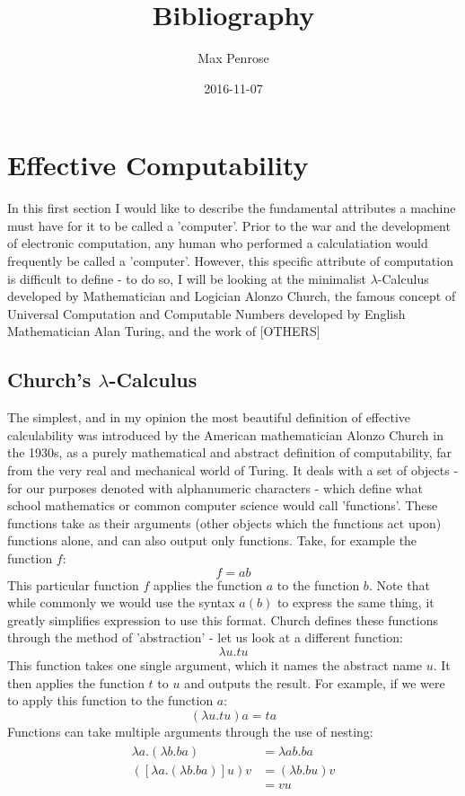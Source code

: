 \documentclass {article}
\title{Bibliography}
\date{2016-11-07}
\author{Max Penrose}
\begin{document}


\section{Effective Computability}

In this first section I would like to describe the fundamental attributes a machine must have for it to be called a 'computer'. Prior to the war and the development of electronic computation, any human who performed a calculatiation would  frequently be called a 'computer'. However, this specific attribute of computation is difficult to define - to do so, I will be looking at the minimalist  $\lambda$-Calculus developed by Mathematician and Logician Alonzo Church, the famous concept of Universal Computation and  Computable Numbers developed by English Mathematician Alan Turing, and the work of [OTHERS]


\subsection{Church's $\lambda$-Calculus}

The simplest, and in my opinion the most beautiful definition of effective calculability was introduced by the American mathematician Alonzo Church in the 1930s, as a purely mathematical and abstract definition of computability, far from the very real and mechanical world of Turing. It deals with a set of objects - for our purposes denoted with alphanumeric characters - which define what school mathematics or common computer science would call 'functions'. These functions take as their arguments (other objects which the functions act upon) functions alone, and can also output only functions. Take, for example the function $f$:
\begin{equation*}
f = ab
\end{equation*}
This particular function $f$ applies the function $a$ to the function $b$. Note that while commonly we would use the syntax $\mathit{a(b)}$ to express the same thing, it greatly simplifies expression to use this format. Church defines these functions through the method of 'abstraction' - let us look at a different function:
\begin{equation*}
\lambda u.tu
\end{equation*}
This function takes one single argument, which it names the abstract name $u$. It then applies the function $t$ to $u$ and outputs the result. For example, if we were to apply this function to the function $a$:
\begin{equation*}
(\lambda u.tu) a = ta	
\end{equation*}
Functions can take multiple arguments through the use of nesting:
\begin{gather*}
\begin{aligned}
\lambda a.(\lambda b.ba) &=  \lambda ab.ba \\
([\lambda a.(\lambda b.ba)]u)v &= (\lambda b.bu)v \\ &= vu
\end{aligned}
\end{gather*}
\end{document}

